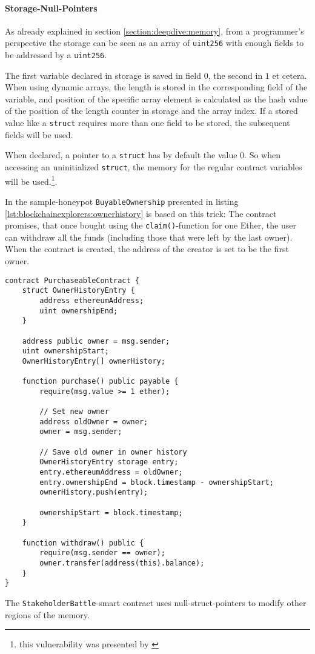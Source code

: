 \paragraph{Storage-Null-Pointers}
As already explained in section \ref{section:deepdive:memory}, from a programmer's perspective the storage can be seen as an array of \texttt{uint256} with enough fields to be addressed by a \texttt{uint256}.

The first variable declared in storage is saved in field \( 0 \), the second in \( 1 \) et cetera. When using dynamic arrays, the length is stored in the corresponding field of the variable, and position of the specific array element is calculated as the hash value of the position of the length counter in storage and the array index. If a stored value like a \texttt{struct} requires more than one field to be stored, the subsequent fields will be used.

When declared, a pointer to a \texttt{struct} has by default the value \( 0 \). So when accessing an uninitialized \texttt{struct}, the memory for the regular contract variables will be used.\footnote{this vulnerability was presented by \cite{cryptronics:nullstruct}}.

In the sample-honeypot \texttt{BuyableOwnership} presented in listing \ref{lst:blockchainexplorers:ownerhistory} is based on this trick: The contract promises, that once bought using the \texttt{claim()}-function for one Ether, the user can withdraw all the funds (including those that were left by the last owner). When the contract is created, the address of the creator is set to be the first owner.

\begin{listing}[H]
	\begin{verbatim}
contract PurchaseableContract {
    struct OwnerHistoryEntry {
        address ethereumAddress;
        uint ownershipEnd;
    }
    
    address public owner = msg.sender;
    uint ownershipStart;
    OwnerHistoryEntry[] ownerHistory;
    
    function purchase() public payable {
        require(msg.value >= 1 ether);
		
        // Set new owner
        address oldOwner = owner;
        owner = msg.sender;

        // Save old owner in owner history        
        OwnerHistoryEntry storage entry;
        entry.ethereumAddress = oldOwner;
        entry.ownershipEnd = block.timestamp - ownershipStart;
        ownerHistory.push(entry);
    
        ownershipStart = block.timestamp;
    }
    
    function withdraw() public {
        require(msg.sender == owner);
        owner.transfer(address(this).balance);
    }
}
\end{verbatim}
	\caption{The \texttt{StakeholderBattle}-smart contract uses null-struct-pointers to modify other regions of the memory.}
	\label{lst:blockchainexplorers:ownerhistory}
\end{listing}

